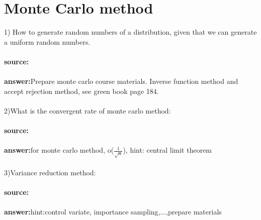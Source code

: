 \documentclass[11pt,fleqn]{book} %
\begin{document}
\section{Monte Carlo method}
1) How to generate random numbers of a distribution, given that we can generate a uniform random numbers.\\\\
\textbf{source:}\\\\
\textbf{answer:}Prepare monte carlo course materials. Inverse function method and accept rejection method, see green book page 184.\\\\
2)What is the convergent rate of monte carlo method:\\\\
\textbf{source:}\\\\
\textbf{answer:}for monte carlo method, o($\frac{1}{\sqrt{n}}$), hint: central limit theorem \\\\
3)Variance reduction method:\\\\
\textbf{source:}\\\\
\textbf{answer:}hint:control variate, importance sampling,...,prepare materials\\\\
\end{document}
